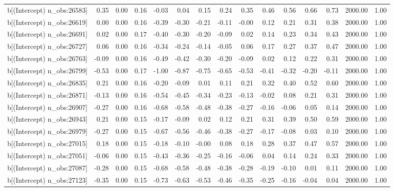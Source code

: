 \begin{table}[ht]
\begin{tabular}{rrrrrrrrrrrrrrr}
  b[(Intercept) n\_obs:26583] & 0.35 & 0.00 & 0.16 & -0.03 & 0.04 & 0.15 & 0.24 & 0.35 & 0.46 & 0.56 & 0.66 & 0.73 & 2000.00 & 1.00 \\ 
  b[(Intercept) n\_obs:26619] & 0.00 & 0.00 & 0.16 & -0.39 & -0.30 & -0.21 & -0.11 & -0.00 & 0.12 & 0.21 & 0.31 & 0.38 & 2000.00 & 1.00 \\ 
  b[(Intercept) n\_obs:26691] & 0.02 & 0.00 & 0.17 & -0.40 & -0.30 & -0.20 & -0.09 & 0.02 & 0.14 & 0.23 & 0.34 & 0.43 & 2000.00 & 1.00 \\ 
  b[(Intercept) n\_obs:26727] & 0.06 & 0.00 & 0.16 & -0.34 & -0.24 & -0.14 & -0.05 & 0.06 & 0.17 & 0.27 & 0.37 & 0.47 & 2000.00 & 1.00 \\ 
  b[(Intercept) n\_obs:26763] & -0.09 & 0.00 & 0.16 & -0.49 & -0.42 & -0.30 & -0.20 & -0.09 & 0.02 & 0.12 & 0.22 & 0.31 & 2000.00 & 1.00 \\ 
  b[(Intercept) n\_obs:26799] & -0.53 & 0.00 & 0.17 & -1.00 & -0.87 & -0.75 & -0.65 & -0.53 & -0.41 & -0.32 & -0.20 & -0.11 & 2000.00 & 1.00 \\ 
  b[(Intercept) n\_obs:26835] & 0.21 & 0.00 & 0.16 & -0.20 & -0.09 & 0.01 & 0.11 & 0.21 & 0.32 & 0.40 & 0.52 & 0.60 & 2000.00 & 1.00 \\ 
  b[(Intercept) n\_obs:26871] & -0.13 & 0.00 & 0.16 & -0.54 & -0.45 & -0.34 & -0.23 & -0.13 & -0.02 & 0.08 & 0.21 & 0.31 & 2000.00 & 1.00 \\ 
  b[(Intercept) n\_obs:26907] & -0.27 & 0.00 & 0.16 & -0.68 & -0.58 & -0.48 & -0.38 & -0.27 & -0.16 & -0.06 & 0.05 & 0.14 & 2000.00 & 1.00 \\ 
  b[(Intercept) n\_obs:26943] & 0.21 & 0.00 & 0.15 & -0.17 & -0.09 & 0.02 & 0.12 & 0.21 & 0.31 & 0.39 & 0.50 & 0.59 & 2000.00 & 1.00 \\ 
  b[(Intercept) n\_obs:26979] & -0.27 & 0.00 & 0.15 & -0.67 & -0.56 & -0.46 & -0.38 & -0.27 & -0.17 & -0.08 & 0.03 & 0.10 & 2000.00 & 1.00 \\ 
  b[(Intercept) n\_obs:27015] & 0.18 & 0.00 & 0.15 & -0.18 & -0.10 & -0.00 & 0.08 & 0.18 & 0.28 & 0.37 & 0.47 & 0.57 & 2000.00 & 1.00 \\ 
  b[(Intercept) n\_obs:27051] & -0.06 & 0.00 & 0.15 & -0.43 & -0.36 & -0.25 & -0.16 & -0.06 & 0.04 & 0.14 & 0.24 & 0.33 & 2000.00 & 1.00 \\ 
  b[(Intercept) n\_obs:27087] & -0.28 & 0.00 & 0.15 & -0.68 & -0.58 & -0.48 & -0.38 & -0.28 & -0.19 & -0.10 & 0.01 & 0.11 & 2000.00 & 1.00 \\ 
  b[(Intercept) n\_obs:27123] & -0.35 & 0.00 & 0.15 & -0.73 & -0.63 & -0.53 & -0.46 & -0.35 & -0.25 & -0.16 & -0.04 & 0.04 & 2000.00 & 1.00 \\ 

\end{tabular}
\end{table}
